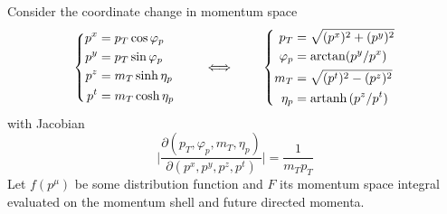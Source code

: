 Consider the coordinate change in momentum space
\begin{equation}
    \left\{
    \begin{split}
        p^x&=p_T\cos\varphi_p\\
        p^y&=p_T\sin\varphi_p\\
        p^z&=m_T\sinh\eta_p\\
        p^t&=m_T\cosh\eta_p
    \end{split}
    \right.\qquad\iff\qquad
    \left\{
    \begin{split}
        p_T&=\sqrt{(p^x)^2+(p^y)^2}\\
        \varphi_p&=\arctan(p^y/p^x)\\
        m_T&=\sqrt{(p^t)^2-(p^z)^2}\\
        \eta_p&={\text{artanh}\,}(p^z/p^t)
    \end{split}
    \right.
\end{equation}
with Jacobian
\begin{equation}
    \big\vert\frac{\partial(p_T,\varphi_p,m_T,\eta_p)}{\partial(p^x,p^y,p^z,p^t)}\big\vert=\frac{1}{m_T p_T}
\end{equation}
Let $f(p^\mu)$ be some distribution function and $F$ its momentum space integral evaluated on the momentum shell and future directed momenta.

